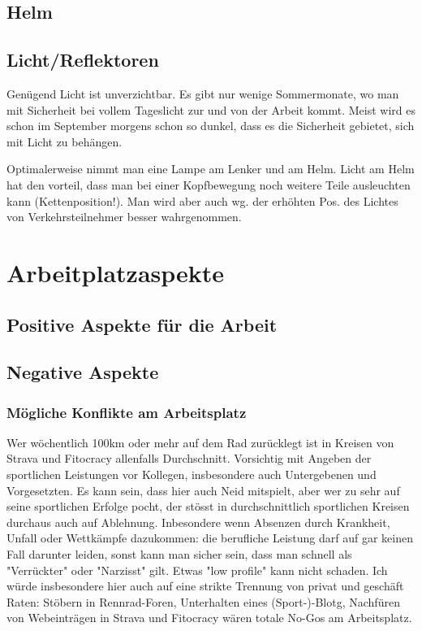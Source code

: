 \documentclass[a4paper,DIV13,BCOR1cm]{scrbook}
\begin{document}
\section{Helm}

\section{Licht/Reflektoren}

Genügend Licht ist unverzichtbar. Es gibt nur wenige Sommermonate, wo man mit Sicherheit bei vollem Tageslicht zur und von der Arbeit kommt.
Meist wird es schon im September morgens schon so dunkel, dass es die Sicherheit gebietet, sich mit Licht zu behängen.

Optimalerweise nimmt man eine Lampe am Lenker und am Helm. Licht am Helm hat den vorteil, dass man bei einer Kopfbewegung
noch weitere Teile ausleuchten kann (Kettenposition!). Man wird aber auch wg. der erhöhten Pos. des Lichtes
von Verkehrsteilnehmer besser wahrgenommen.

\chapter{Arbeitplatzaspekte}

\section{Positive Aspekte für die Arbeit}

\section{Negative Aspekte}

\subsection{Mögliche Konflikte am Arbeitsplatz}

Wer wöchentlich 100km oder mehr auf dem Rad zurücklegt ist in Kreisen von Strava und Fitocracy allenfalls Durchschnitt.
Vorsichtig mit Angeben der sportlichen Leistungen vor Kollegen, insbesondere auch Untergebenen und Vorgesetzten.
Es kann sein, dass hier auch Neid mitspielt, aber wer zu sehr auf seine sportlichen Erfolge pocht,
der stösst in durchschnittlich sportlichen Kreisen durchaus auch auf Ablehnung.
Inbesondere wenn Absenzen durch Krankheit, Unfall oder Wettkämpfe dazukommen:
die berufliche Leistung darf auf gar keinen Fall darunter leiden, sonst kann man sicher sein, dass man schnell als "Verrückter" oder "Narzisst" gilt.
Etwas "low profile" kann nicht schaden. Ich würde insbesondere hier auch auf eine strikte Trennung von privat und geschäft Raten: Stöbern in Rennrad-Foren, Unterhalten eines (Sport-)-Blotg, Nachfüren von Webeinträgen in Strava und Fitocracy wären totale No-Gos am Arbeitsplatz.
\end{document}
